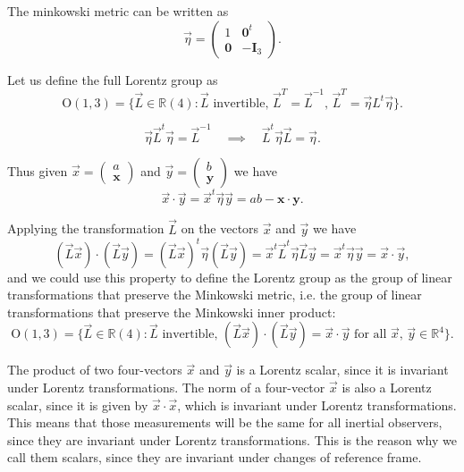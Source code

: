 The minkowski metric can be written as
\[
    \vec{\eta} = \begin{pmatrix}
        1          & \mathbf{0}^t  \\
        \mathbf{0} & -\mathbf{I}_3
    \end{pmatrix}.
\]

Let us define the full Lorentz group as
\[
    \mathrm{O}(1,3) = \{ \vec{L} \in \mathbb{R}(4) : \vec{L} \text{ invertible},\, \vec{L}^T = \vec{L}^{-1},\, \vec{L}^T = \vec{\eta} L^t \vec{\eta} \}.
\]

\[
    \vec{\eta} \vec{L}^t \vec{\eta} = \vec{L}^{-1} \quad \implies \quad \vec{L}^t \vec{\eta} \vec{L} = \vec{\eta}.
\]

Thus given \(\vec{x} = \begin{pmatrix}
    a \\
    \mathbf{x}
\end{pmatrix}\) and \(\vec{y} = \begin{pmatrix}
    b \\
    \mathbf{y}
\end{pmatrix}\) we have
\[
    \vec{x} \cdot \vec{y} = \vec{x}^t \vec{\eta} \vec{y} = a b - \mathbf{x} \cdot \mathbf{y}.
\]

Applying the transformation \(\vec{L}\) on the vectors \(\vec{x}\) and \(\vec{y}\) we have
\[
    (\vec{L} \vec{x}) \cdot (\vec{L} \vec{y}) = (\vec{L} \vec{x})^t \vec{\eta} (\vec{L} \vec{y}) = \vec{x}^t \vec{L}^t \vec{\eta} \vec{L} \vec{y} = \vec{x}^t \vec{\eta} \vec{y} = \vec{x} \cdot \vec{y},
\]
and we could use this property to define the Lorentz group as the group of linear transformations that preserve the Minkowski metric, i.e. the group of linear transformations that preserve the Minkowski inner product:
\[
    \mathrm{O}(1,3) = \{ \vec{L} \in \mathbb{R}(4) : \vec{L} \text{ invertible},\, (\vec{L} \vec{x}) \cdot (\vec{L} \vec{y}) = \vec{x} \cdot \vec{y} \text{ for all } \vec{x},\,\vec{y} \in \mathbb{R}^4\}.
\]

The product of two four-vectors \(\vec{x}\) and \(\vec{y}\) is a Lorentz scalar, since it is invariant under Lorentz transformations. The norm of a four-vector \(\vec{x}\) is also a Lorentz scalar, since it is given by \(\vec{x} \cdot \vec{x}\), which is invariant under Lorentz transformations. This means that those measurements will be the same for all inertial observers, since they are invariant under Lorentz transformations. This is the reason why we call them scalars, since they are invariant under changes of reference frame.

